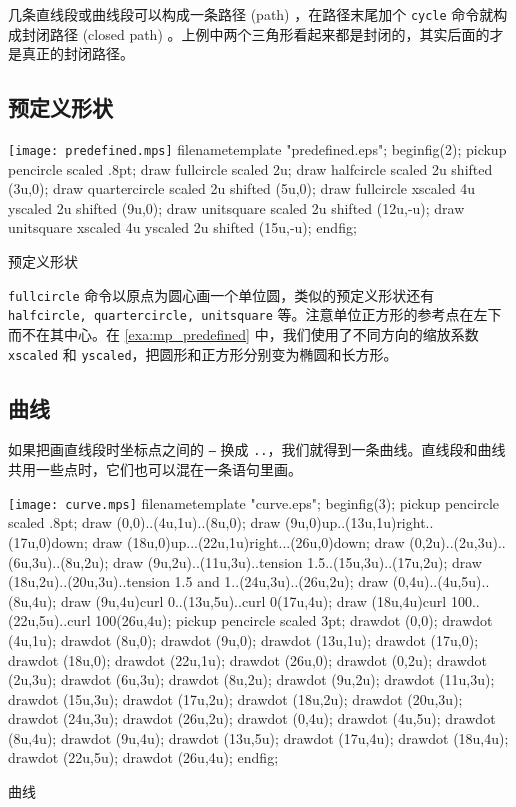 几条直线段或曲线段可以构成一条路径 (path) ，在路径末尾加个 \texttt{cycle} 命令就构成封闭路径 (closed path) 。上例中两个三角形看起来都是封闭的，其实后面的才是真正的封闭路径。

\subsection{预定义形状}

\begin{example}[htbp]
\begin{FBTDemo}[numbers=left]{\texttt{[image: predefined.mps]}}
filenametemplate "predefined.eps";
beginfig(2);
pickup pencircle scaled .8pt;
draw fullcircle scaled 2u;
draw halfcircle scaled 2u shifted (3u,0);
draw quartercircle scaled 2u shifted (5u,0);
draw fullcircle xscaled 4u yscaled 2u shifted (9u,0);
draw unitsquare scaled 2u shifted (12u,-u);
draw unitsquare xscaled 4u yscaled 2u shifted (15u,-u);
endfig;
\end{FBTDemo}
\vspace{1em}
\caption{\MP 预定义形状}
\label{exa:mp_predefined}
\end{example}

\texttt{fullcircle} 命令以原点为圆心画一个单位圆，类似的预定义形状还有 \texttt{halfcircle, quartercircle, unitsquare} 等。注意单位正方形的参考点在左下而不在其中心。在 \autoref{exa:mp_predefined} 中，我们使用了不同方向的缩放系数 \texttt{xscaled} 和 \texttt{yscaled}，把圆形和正方形分别变为椭圆和长方形。

\subsection{曲线}

如果把画直线段时坐标点之间的 \texttt{--} 换成 \texttt{..}，我们就得到一条曲线。直线段和曲线共用一些点时，它们也可以混在一条语句里画。

\begin{example}[htbp]
\begin{FBTDemo}[numbers=left]{\texttt{[image: curve.mps]}}
filenametemplate "curve.eps";
beginfig(3);
pickup pencircle scaled .8pt;
draw (0,0)..(4u,1u)..(8u,0);
draw (9u,0){up}..(13u,1u){right}..(17u,0){down};
draw (18u,0){up}...(22u,1u){right}...(26u,0){down};
draw (0,2u)..(2u,3u)..(6u,3u)..(8u,2u);
draw (9u,2u)..(11u,3u)..tension 1.5..(15u,3u)..(17u,2u);
draw (18u,2u)..(20u,3u)..tension 1.5 
  and 1..(24u,3u)..(26u,2u);
draw (0,4u)..(4u,5u)..(8u,4u);
draw (9u,4u){curl 0}..(13u,5u)..{curl 0}(17u,4u);
draw (18u,4u){curl 100}..(22u,5u)..{curl 100}(26u,4u);
pickup pencircle scaled 3pt;
drawdot (0,0); drawdot (4u,1u); drawdot (8u,0);
drawdot (9u,0); drawdot (13u,1u); drawdot (17u,0);
drawdot (18u,0); drawdot (22u,1u); drawdot (26u,0);
drawdot (0,2u); drawdot (2u,3u); drawdot (6u,3u); 
  drawdot (8u,2u);
drawdot (9u,2u); drawdot (11u,3u); drawdot (15u,3u); 
  drawdot (17u,2u);
drawdot (18u,2u); drawdot (20u,3u); drawdot (24u,3u); 
  drawdot (26u,2u);
drawdot (0,4u); drawdot (4u,5u); drawdot (8u,4u);
drawdot (9u,4u); drawdot (13u,5u); drawdot (17u,4u);
drawdot (18u,4u); drawdot (22u,5u); drawdot (26u,4u);
endfig;
\end{FBTDemo}
\caption{\MP 曲线}
\label{exa:mp_curve}
\end{example}


